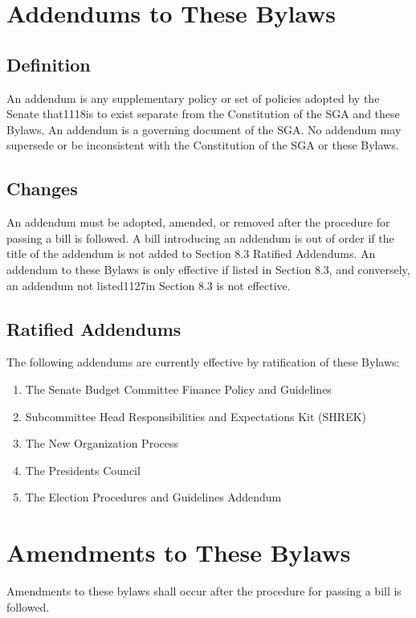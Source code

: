\documentclass[12pt]{scrreprt}
\begin{document}
\chapter{Addendums to These Bylaws} \label{sec:addendums}

\section{Definition}
An addendum is any supplementary policy or set of policies adopted by the Senate that1118is to exist separate from the Constitution of the SGA and these Bylaws.  An addendum is a governing document of the SGA. No addendum may supersede or be inconsistent with the Constitution of the SGA or these Bylaws.

\section{Changes}
An addendum must be adopted, amended, or removed after the procedure for passing a  bill  is  followed.   A  bill  introducing  an  addendum  is  out  of  order  if  the  title  of  the addendum  is  not  added  to  Section  8.3  Ratified  Addendums.   An  addendum  to  these Bylaws is only effective if listed in Section 8.3, and conversely, an addendum not listed1127in Section 8.3 is not effective.

\section{Ratified Addendums}
The following addendums are currently effective by ratification of these Bylaws:
\begin{enumerate}
    \item The Senate Budget Committee Finance Policy and Guidelines
    \item  Subcommittee Head Responsibilities and Expectations Kit (SHREK)
    \item The New Organization Process 
    \item  The Presidents Council
    \item The Election Procedures and Guidelines Addendum
\end{enumerate}


\chapter{Amendments to These Bylaws} \label{sec:amendments}
Amendments to these bylaws shall occur after the procedure for passing a bill 
is followed. 
\end{document}
